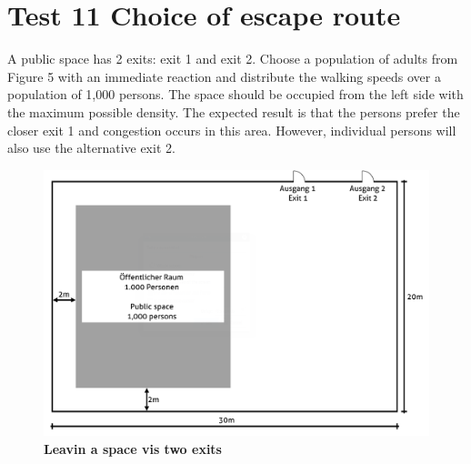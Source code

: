 \section*{Test 11 Choice of escape route}

A public space has 2 exits: exit 1 and exit 2. Choose a population of adults from Figure 5 with an immediate reaction and distribute the walking speeds over a population of 1,000 persons. The space should be occupied from the left side with the maximum possible density. The expected result is that the persons prefer the closer exit 1 and congestion occurs in this area. However, individual persons will also use the alternative exit 2.

\begin{figure}[h]
	\centering
	\includegraphics[scale=0.44]{test_description/Large_public_space_test_11.png}
	\caption{\footnotesize \textbf{Leavin a space vis two exits}}
\end{figure}

